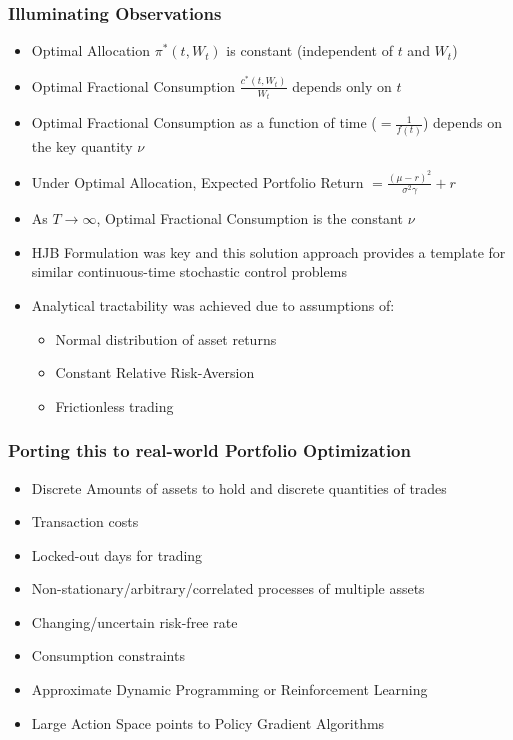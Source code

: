 \documentclass{beamer}
\begin{document}
\begin{frame}
\frametitle{Illuminating Observations}
\begin{itemize}
\item Optimal Allocation $\pi^*(t, W_t)$ is constant (independent of $t$ and $W_t$)
\item Optimal Fractional Consumption $\frac {c^*(t, W_t)} {W_t}$ depends only on $t$
\item Optimal Fractional Consumption as a function of time ($=\frac 1 {f(t)}$) depends on the key quantity $\nu$ 
\item Under Optimal Allocation, Expected Portfolio Return $=\frac {(\mu - r)^2} {\sigma^2 \gamma} + r$
\item As $T \rightarrow \infty$, Optimal Fractional Consumption is the constant $\nu$
\item HJB Formulation was key and this solution approach provides a template for similar continuous-time stochastic control problems
\item Analytical tractability was achieved due to assumptions of:
\begin{itemize}
\item Normal distribution of asset returns
\item Constant Relative Risk-Aversion
\item Frictionless trading
\end{itemize}
\end{itemize}
\end{frame}

\begin{frame}
\frametitle{Porting this to real-world Portfolio Optimization}
\begin{itemize}
\item Discrete Amounts of assets to hold and discrete quantities of trades
\item Transaction costs
\item Locked-out days for trading
\item Non-stationary/arbitrary/correlated processes of multiple assets
\item Changing/uncertain risk-free rate
\item Consumption constraints
\item Approximate Dynamic Programming or Reinforcement Learning
\item Large Action Space points to Policy Gradient Algorithms
\end{itemize}
\end{frame}
\end{document}
